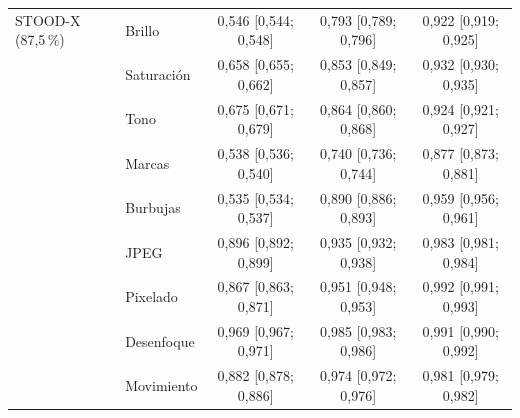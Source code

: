 {\begin{longtable}{llccc}
\midrule
STOOD-X (87,5\,\%) & Brillo & 0{,}546 [0{,}544; 0{,}548] & 0{,}793 [0{,}789; 0{,}796] & 0{,}922 [0{,}919; 0{,}925] \\
 & Saturación & 0{,}658 [0{,}655; 0{,}662] & 0{,}853 [0{,}849; 0{,}857] & 0{,}932 [0{,}930; 0{,}935] \\
 & Tono & 0{,}675 [0{,}671; 0{,}679] & 0{,}864 [0{,}860; 0{,}868] & 0{,}924 [0{,}921; 0{,}927] \\
 & Marcas & 0{,}538 [0{,}536; 0{,}540] & 0{,}740 [0{,}736; 0{,}744] & 0{,}877 [0{,}873; 0{,}881] \\
 & Burbujas & 0{,}535 [0{,}534; 0{,}537] & 0{,}890 [0{,}886; 0{,}893] & 0{,}959 [0{,}956; 0{,}961] \\
 & JPEG & 0{,}896 [0{,}892; 0{,}899] & 0{,}935 [0{,}932; 0{,}938] & 0{,}983 [0{,}981; 0{,}984] \\
 & Pixelado & 0{,}867 [0{,}863; 0{,}871] & 0{,}951 [0{,}948; 0{,}953] & 0{,}992 [0{,}991; 0{,}993] \\
 & Desenfoque & 0{,}969 [0{,}967; 0{,}971] & 0{,}985 [0{,}983; 0{,}986] & 0{,}991 [0{,}990; 0{,}992] \\
 & Movimiento & 0{,}882 [0{,}878; 0{,}886] & 0{,}974 [0{,}972; 0{,}976] & 0{,}981 [0{,}979; 0{,}982] \\
\end{longtable}
}

